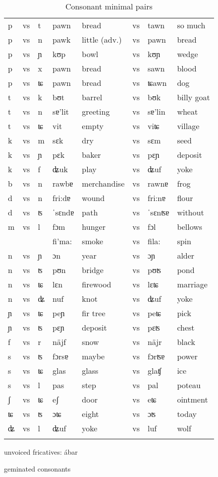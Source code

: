 \begin{table}
\caption{Consonant minimal pairs}
\label{cmp}
 \begin{tabular}{llllllll}
  \midrule
p&vs&t&pawn&bread&vs&tawn&so much\\
p&vs&n&pawk&little (adv.)&vs&pawn&bread \\
p&vs&ɲ&kʊp&bowl&vs&kʊɲ&wedge \\
p&vs&x&pawn&bread&vs&sawn&blood \\
p&vs&ʨ&pawn&bread&vs&ʨawn&dog \\
t&vs&k& bʊt&barrel&vs&bʊk&billy goat \\
t&vs&n&sɐ'lit&greeting&vs&sɐ'lin&wheat \\
t&vs&ʨ&vit&empty&vs&viʨ&village \\
k&vs&m&sɛk&dry&vs&sɛm&seed \\
k&vs&ɲ&pɛk&baker&vs&pɛɲ&deposit \\
k&vs&f&ʥuk&play&vs&ʥuf&yoke\\
b&vs&n&rawbɐ&merchandise&vs&rawnɐ&frog\\
d&vs&n&fri:dɐ&wound&vs&fri:nɐ&flour\\
d&vs&ʦ&ˈsɛndɐ&path&vs&ˈsɛnʦɐ&without\\
m&vs&l&fɔm & hunger & vs & fɔl & bellows\\
&&&fi'ma:& smoke & vs& fila:& spin\\
n&vs&ɲ&ɔn&year&vs&ɔɲ&alder\\
n&vs&ʦ&pʊn&bridge&vs&pʊʦ&pond\\
n&vs&ʨ&lɛn&firewood&vs&lɛʨ&marriage\\
n&vs&ʥ& nuf&knot&vs&ʥuf&yoke\\
ɲ&vs&ʨ&peɲ&fir tree&vs&peʨ & pick\\
ɲ&vs&ʦ&pɛɲ&deposit&vs&pɛʦ&chest\\
f&vs&r& näjf &snow&vs&näjr&black\\
s&vs&ʦ&fɔrsɐ&maybe&vs&fɔrʦɐ&power\\
s&vs&ʨ&glas&glass&vs&glaʧ&ice\\
s&vs&l& pas&step&vs&pal&poteau\\
ʃ&vs&ʨ&eʃ&door&vs &eʨ&ointment\\
ʨ&vs&ʦ&ɔʨ&eight&vs&ɔʦ&today\\
ʥ&vs&l&ʥuf&yoke&vs&luf&wolf\\
  \lspbottomrule
 \end{tabular}
\end{table}


unvoiced fricatives: ábar

geminated consonants

